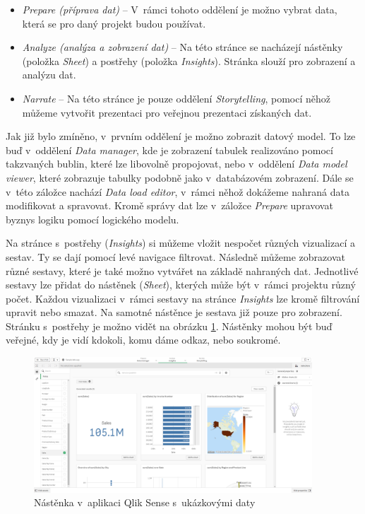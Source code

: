 \documentclass[czech,master]{diploma}
\begin{document}
\begin{itemize}
\item \textit{Prepare (příprava dat)} -- V~rámci tohoto oddělení je možno vybrat data, která se pro daný projekt budou používat.
\item \textit{Analyze (analýza a zobrazení dat)} -- Na této stránce se nacházejí nástěnky (položka \textit{Sheet}) a postřehy (položka \textit{Insights}). Stránka slouží pro zobrazení a analýzu dat.
\item \textit{Narrate} -- Na této stránce je pouze oddělení \textit{Storytelling}, pomocí něhož můžeme vytvořit prezentaci pro veřejnou prezentaci získaných dat.
\end{itemize}


Jak již bylo zmíněno, v~prvním oddělení je možno zobrazit datový model. To lze buď v~oddělení \textit{Data manager}, kde je zobrazení tabulek realizováno pomocí takzvaných bublin, které lze libovolně propojovat, nebo v~oddělení \textit{Data model viewer}, které zobrazuje tabulky podobně jako v~databázovém zobrazení. Dále se v~této záložce nachází \textit{Data load editor}, v~rámci něhož dokážeme nahraná data modifikovat a spravovat. Kromě správy dat lze v~záložce \textit{Prepare} upravovat byznys logiku pomocí logického modelu.

Na stránce s~postřehy (\textit{Insights})  si můžeme vložit nespočet různých vizualizací a sestav. Ty se dají pomocí levé navigace filtrovat. Následně můžeme zobrazovat různé sestavy, které je také možno vytvářet na základě nahraných dat. Jednotlivé sestavy lze přidat do nástěnek (\textit{Sheet}), kterých může být v~rámci projektu různý počet. Každou vizualizaci v~rámci sestavy na stránce \textit{Insights} lze kromě filtrování upravit nebo smazat. Na samotné nástěnce je sestava již pouze pro zobrazení. Stránku s~postřehy je možno vidět na obrázku \ref{fig:qlik_dashboard}. Nástěnky mohou být buď veřejné, kdy je vidí kdokoli, komu dáme odkaz, nebo soukromé.

\begin{figure}[!ht]
    \centering
    \includegraphics[width=0.93\textwidth]{Diplomka/Figures/qlik_dashboard.png}
    \caption{Nástěnka v~aplikaci Qlik Sense s~ukázkovými daty}
    \label{fig:qlik_dashboard}
\end{figure}
\end{document}
